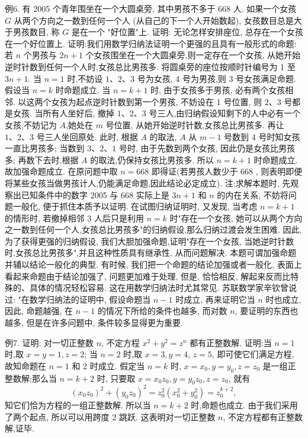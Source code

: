 例6. 有 2005 个青年围坐在一个大圆桌旁, 其中男孩不多于 668 人.
如果一个女孩 $G$ 从两个方向之一数到任何一个人 (从自己的下一个人开始数起), 女孩数目总是大于男孩数目, 称 $G$ 是在一个 "好位置"上.
证明: 无论怎样安排座位, 总存在一个女孩在一个好位置上.
证明:我们用数学归纳法证明一个更强的且具有一般形式的命题:
若 $n$ 个男孩与 $2 n+1$ 个女孩围坐在一个大圆桌旁,则一定存在一个女孩, 从她开始逆时针数到任何一个人时,女孩总比男孩多.
将圆桌旁的座位按顺时针编号为 1 至 $3 n+1$.
当 $n=1$ 时,不妨设 $1 、 2 、 3$ 号为女孩, 4 号为男孩,则 3 号女孩满足命题.
假设当 $n=k$ 时命题成立.
当 $n=k+1$ 时, 由于女孩多于男孩, 必有两个女孩相邻.
以这两个女孩为起点逆时针数到第一个男孩, 不妨设在 1 号位置, 则 $2 、 3$ 号都是女孩.
当所有人坐好后, 撤掉 $1 、 2 、 3$ 号三人,由归纳假设知剩下的人中必有一个女孩,不妨记为 $A$,她处在 $m$ 号位置, 从她开始逆时针数,女孩总比男孩多.
再让 $1 、 2 、 3$ 号三人坐回原处.
此时, 根据 $A$ 的取法, $A$ 从 $m-1$ 号数到 4 号时知女孩一直比男孩多; 当数到 $3 、 2 、 1$ 号时, 由于先数到两个女孩, 因此仍是女孩比男孩多; 再数下去时,根据 $A$ 的取法,仍保持女孩比男孩多.
所以 $n=k+1$ 时命题成立.
故加强命题成立.
在原问题中取 $n=668$ 即得证(若男孩人数少于 668 , 则表明即便将某些女孩当做男孩计人,仍能满足命题,因此结论必定成立).
注:求解本题时, 先观察出已知条件中的数字 2005 与 668 实际上是 $3 n+1$ 和 $n$ 的内在关系, 不妨将问题一般化, 便于抓住本质予以证明.
在试图归纳证明时, 又发现, 当考虑 $n=k+1$ 的情形时, 若撤掉相邻 3 人后只是利用 $n=k$ 时"存在一个女孩, 她可以从两个方向之一数到任何一个人,女孩总比男孩多"的归纳假设,那么归纳过渡会发生困难.
因此, 为了获得更强的归纳假设, 我们大胆加强命题,证明"存在一个女孩, 当她逆时针数时,女孩总比男孩多",并且这种性质具有继承性, 从而问题解决.
本题可谓加强命题并辅以结论一般化的典型.
有时候, 我们把一个命题的结论加强或者一般化, 表面上看起来命题由于结论加强了, 问题更加难于处理, 但是, 恰恰相反, 解起来反而比特殊的、具体的情况轻松容易.
这在用数学归纳法时尤其常见.
苏联数学家辛钦曾说过: "在数学归纳法的证明中, 假设命题当 $n-1$ 时成立, 再来证明它当 $n$ 时也成立, 因此, 命题越强, 在 $n-1$ 的情况下所给的条件也越多, 而对数 $n$, 要证明的东西也越多, 但是在许多问题中, 条件较多显得更为重要.



例7. 证明: 对一切正整数 $n$, 不定方程 $x^2+y^2=z^n$ 都有正整数解.
证明:当 $n=1$ 时,取 $x=y=1, z=2$; 当 $n=2$ 时,取 $x=3, y=4$, $z=5$, 即可使它们满足方程, 故知命题在 $n=1$ 和 2 时成立.
假定当 $n=k$ 时, $x=x_0, y=y_0, z=z_0$ 是一组正整数解;那么当 $n= k+2$ 时, 只要取 $x=x_0 z_0, y=y_0 z_0, z=z_0$, 就有
$$
\left(x_0 z_0\right)^2+\left(y_0 z_0\right)^2=z_0^2\left(x_0^2+y_0^2\right)=z_0^{k+2},
$$
知它们恰为方程的一组正整数解.
所以当 $n=k+2$ 时,命题也成立.
由于我们采用了两个起点, 所以可以用跨度 2 跳跃.
这表明对一切正整数 $n$, 不定方程都有正整数解,证毕.



